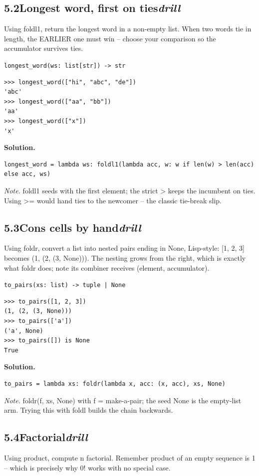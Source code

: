 \documentclass[10pt,letterpaper]{book}
\begin{document}
\subsection*{5.2\quad Longest word, first on ties\hfill\textnormal{\textit{drill}}}
Using foldl1, return the longest word in a non-empty list. When two words tie in length, the EARLIER one must win -- choose your comparison so the accumulator survives ties.

\noindent\texttt{longest\_word(ws: list[str]) -> str}
\begin{lstlisting}[style=ex]
>>> longest_word(["hi", "abc", "de"])
'abc'
>>> longest_word(["aa", "bb"])
'aa'
>>> longest_word(["x"])
'x'
\end{lstlisting}
\noindent\textbf{Solution.}
\begin{lstlisting}[style=code]
longest_word = lambda ws: foldl1(lambda acc, w: w if len(w) > len(acc) else acc, ws)
\end{lstlisting}
\noindent\textit{Note.} foldl1 seeds with the first element; the strict > keeps the incumbent on ties. Using >= would hand ties to the newcomer -- the classic tie-break slip.

\subsection*{5.3\quad Cons cells by hand\hfill\textnormal{\textit{drill}}}
Using foldr, convert a list into nested pairs ending in None, Lisp-style: [1, 2, 3] becomes (1, (2, (3, None))). The nesting grows from the right, which is exactly what foldr does; note its combiner receives (element, accumulator).

\noindent\texttt{to\_pairs(xs: list) -> tuple | None}
\begin{lstlisting}[style=ex]
>>> to_pairs([1, 2, 3])
(1, (2, (3, None)))
>>> to_pairs(['a'])
('a', None)
>>> to_pairs([]) is None
True
\end{lstlisting}
\noindent\textbf{Solution.}
\begin{lstlisting}[style=code]
to_pairs = lambda xs: foldr(lambda x, acc: (x, acc), xs, None)
\end{lstlisting}
\noindent\textit{Note.} foldr(f, xs, None) with f = make-a-pair; the seed None is the empty-list arm. Trying this with foldl builds the chain backwards.

\subsection*{5.4\quad Factorial\hfill\textnormal{\textit{drill}}}
Using product, compute n factorial. Remember product of an empty sequence is 1 -- which is precisely why 0! works with no special case.
\end{document}
